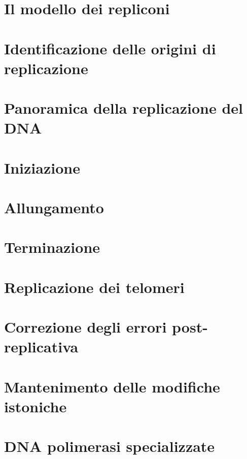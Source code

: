 \section{Il modello dei repliconi}

\section{Identificazione delle origini di replicazione}

\section{Panoramica della replicazione del DNA}

\section{Iniziazione}

\section{Allungamento}

\section{Terminazione}

\section{Replicazione dei telomeri}

\section{Correzione degli errori post-replicativa}

\section{Mantenimento delle modifiche istoniche}

\section{DNA polimerasi specializzate}
